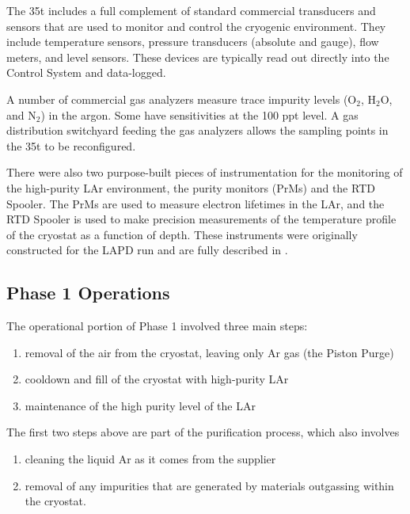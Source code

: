 The 35t includes a full complement of standard commercial transducers and sensors that are used to 
monitor and control the cryogenic environment. They include temperature sensors, pressure transducers 
(absolute and gauge), flow meters, and level sensors. These devices are typically read out directly into the 
Control System and data-logged. 

A number of commercial gas analyzers measure trace impurity levels (O$_2$, H$_2$O, and 
N$_2$) in the argon. Some have sensitivities at the 100 ppt level. A gas distribution switchyard feeding the 
gas analyzers allows the sampling points in the 35t to be reconfigured.

There were also two purpose-built pieces of instrumentation for the monitoring of the high-purity 
LAr environment,   %
the purity monitors (PrMs) and the RTD Spooler. The 
PrMs are used to measure electron lifetimes in the LAr, and the RTD Spooler is used to make precision 
measurements of the temperature profile of the cryostat as a function of depth.  These instruments were 
originally constructed for the LAPD run and are fully described %
in \cite{bib:lapdP07005}.

\subsection {Phase 1 Operations}


The operational portion of Phase 1 involved three main steps: 

\begin{enumerate}
\item{removal of the air from the cryostat, leaving only Ar gas (the Piston Purge)}
\item cooldown and fill of the cryostat with high-purity LAr
\item maintenance of the high purity level of the LAr
\end{enumerate}

The first two steps above are part of the purification process, which also involves 
\begin{enumerate}
\item{cleaning the liquid Ar as it comes from the supplier}
\item{removal of any impurities that are generated by materials outgassing within the cryostat.}
\end{enumerate}
  
